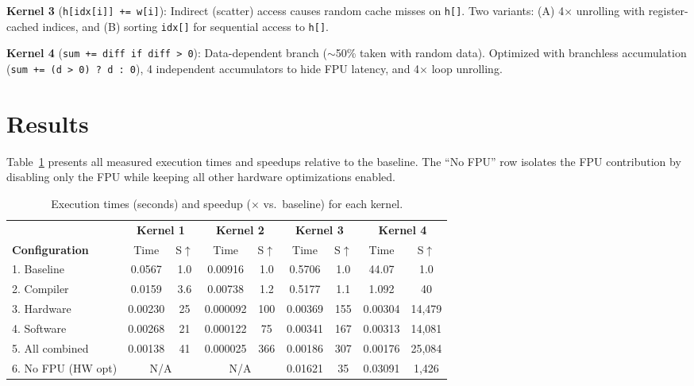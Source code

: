 \documentclass[11pt,a4paper]{article}
\begin{document}
\textbf{Kernel 3} (\texttt{h[idx[i]] += w[i]}): Indirect (scatter) access causes random cache misses on \texttt{h[]}. Two variants: (A) 4$\times$ unrolling with register-cached indices, and (B) sorting \texttt{idx[]} for sequential access to \texttt{h[]}.

\textbf{Kernel 4} (\texttt{sum += diff if diff > 0}): Data-dependent branch ($\sim$50\% taken with random data). Optimized with branchless accumulation (\texttt{sum += (d > 0) ? d : 0}), 4 independent accumulators to hide FPU latency, and 4$\times$ loop unrolling.

\section{Results}

Table~\ref{tab:results} presents all measured execution times and speedups relative to the baseline. The ``No FPU'' row isolates the FPU contribution by disabling only the FPU while keeping all other hardware optimizations enabled.

\begin{table}[H]
\centering
\caption{Execution times (seconds) and speedup ($\times$ vs.\ baseline) for each kernel.}
\label{tab:results}
\small
\setlength{\tabcolsep}{3.5pt}
\begin{tabular}{l cc cc cc cc}
\toprule
 & \multicolumn{2}{c}{\textbf{Kernel 1}} & \multicolumn{2}{c}{\textbf{Kernel 2}} & \multicolumn{2}{c}{\textbf{Kernel 3}} & \multicolumn{2}{c}{\textbf{Kernel 4}} \\
\cmidrule(lr){2-3}\cmidrule(lr){4-5}\cmidrule(lr){6-7}\cmidrule(lr){8-9}
\textbf{Configuration} & Time & S$\uparrow$ & Time & S$\uparrow$ & Time & S$\uparrow$ & Time & S$\uparrow$ \\
\midrule
1. Baseline          & 0.0567 & 1.0  & 0.00916 & 1.0  & 0.5706 & 1.0  & 44.07  & 1.0 \\
2. Compiler          & 0.0159 & 3.6  & 0.00738 & 1.2  & 0.5177 & 1.1  & 1.092  & 40 \\
3. Hardware          & 0.00230 & 25  & 0.000092 & 100 & 0.00369 & 155 & 0.00304 & 14{,}479 \\
4. Software          & 0.00268 & 21  & 0.000122 & 75  & 0.00341 & 167 & 0.00313 & 14{,}081 \\
5. All combined      & 0.00138 & 41  & 0.000025 & 366 & 0.00186 & 307 & 0.00176 & 25{,}084 \\
\midrule
6. No FPU (HW opt)   & \multicolumn{2}{c}{N/A} & \multicolumn{2}{c}{N/A} & 0.01621 & 35 & 0.03091 & 1{,}426 \\
\bottomrule
\end{tabular}
\end{table}
\end{document}

